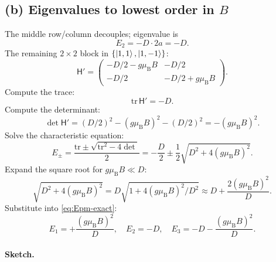 \documentclass[11pt]{article}
\begin{document}
\subsection*{(b) Eigenvalues to lowest order in $B$}

The middle row/column decouples; eigenvalue is
\begin{equation}
E_2=-D\cdot 2a=-D.
\end{equation}
The remaining $2\times 2$ block in $\{\ket{1,1},\ket{1,-1}\}$:
\begin{equation}
\mathsf H'=\begin{pmatrix}-D/2-g\mu_{\mathrm B}B&-D/2\\-D/2&-D/2+g\mu_{\mathrm B}B\end{pmatrix}.
\label{eq:Hprime}
\end{equation}
Compute the trace:
\begin{equation}
\mathrm{tr}\,\mathsf H'=-D.
\end{equation}
Compute the determinant:
\begin{equation}
\det\mathsf H'=(D/2)^{2}-(g\mu_{\mathrm B}B)^{2}-(D/2)^{2}=-(g\mu_{\mathrm B}B)^{2}.
\end{equation}
Solve the characteristic equation:
\begin{equation}
E_{\pm}=\frac{\mathrm{tr}\pm\sqrt{\mathrm{tr}^{2}-4\det}}{2}=-\frac{D}{2}\pm\frac{1}{2}\sqrt{D^{2}+4(g\mu_{\mathrm B}B)^{2}}.
\label{eq:Epm-exact}
\end{equation}
Expand the square root for $g\mu_{\mathrm B}B\ll D$:
\begin{equation}
\sqrt{D^{2}+4(g\mu_{\mathrm B}B)^{2}}=D\sqrt{1+4(g\mu_{\mathrm B}B)^{2}/D^{2}}\approx D+\frac{2(g\mu_{\mathrm B}B)^{2}}{D}.
\label{eq:sqrt-expand}
\end{equation}
Substitute into \eqref{eq:Epm-exact}:
\begin{equation}
\boxed{\,E_{1}=+\frac{(g\mu_{\mathrm B}B)^{2}}{D},\quad E_{2}=-D,\quad E_{3}=-D-\frac{(g\mu_{\mathrm B}B)^{2}}{D}.\,}
\label{eq:E123}
\end{equation}

\paragraph{Sketch.}
\begin{center}
\end{center}
\end{document}
